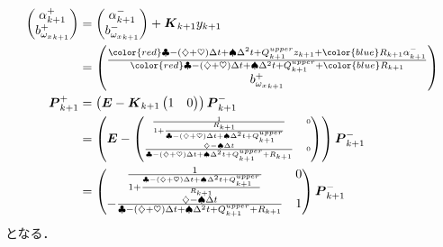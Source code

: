 \begin{align}
  \begin{pmatrix}
    \alpha_{k+1}^{+}\\
    b_{{\omega_x}_{k+1}}^{+}
  \end{pmatrix} &=
  \begin{pmatrix}
    \alpha_{k+1}^{-}\\
    b_{{\omega_x}_{k+1}}^{-}
  \end{pmatrix} +
  \boldsymbol{K}_{k+1} y_{k+1}\\
  &=
  \begin{pmatrix}
    \frac{{\color{red} \clubsuit - (\diamondsuit + \heartsuit) \Delta t + \spadesuit \Delta^2 t + Q^{upper}_{k+1}} z_{k+1} + {\color{blue} R_{k+1}} \alpha_{k+1}^{-}}{{\color{red} \clubsuit - (\diamondsuit + \heartsuit) \Delta t + \spadesuit \Delta^2 t + Q^{upper}_{k+1}} + {\color{blue} R_{k+1}}}\\
    b_{{\omega_x}_{k+1}}^{+}
  \end{pmatrix}\\
  \boldsymbol{P}_{k+1}^{+} &= \left(\boldsymbol{E} - \boldsymbol{K}_{k+1}
  \begin{pmatrix}
    1 & 0
  \end{pmatrix}
  \right) \boldsymbol{P}_{k+1}^{-}\\
  &=
  \left(\boldsymbol{E} -
  {\tiny
    \begin{pmatrix}
      \frac{1}{1 + \frac{R_{k+1}}{\clubsuit - (\diamondsuit + \heartsuit) \Delta t + \spadesuit \Delta^2 t + Q^{upper}_{k+1}}} & 0\\
      \frac{\diamondsuit - \spadesuit \Delta t}{\clubsuit - (\diamondsuit + \heartsuit) \Delta t + \spadesuit \Delta^2 t + Q^{upper}_{k+1} + R_{k+1}} & 0
    \end{pmatrix}
  }
  \right) \boldsymbol{P}_{k+1}^{-}\\
  &=
  \begin{pmatrix}
    \frac{1}{1 + \frac{\clubsuit - (\diamondsuit + \heartsuit) \Delta t + \spadesuit \Delta^2 t + Q^{upper}_{k+1}}{R_{k+1}}} & 0\\
    -\frac{\diamondsuit - \spadesuit \Delta t}{\clubsuit - (\diamondsuit + \heartsuit) \Delta t + \spadesuit \Delta^2 t + Q^{upper}_{k+1} + R_{k+1}} & 1
  \end{pmatrix}
  \boldsymbol{P}_{k+1}^{-}
\end{align}
となる．

